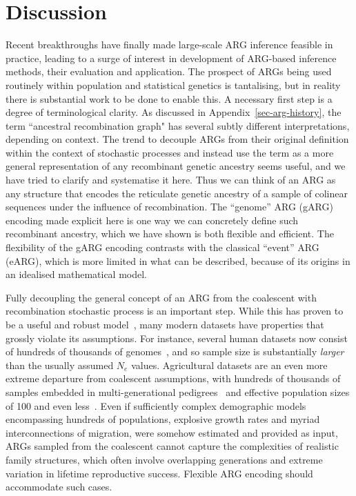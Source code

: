 \documentclass{article}
\begin{document}
\section{Discussion}
\label{sec-discussion}
Recent breakthroughs have finally made large-scale ARG inference
feasible in practice, leading to a surge of interest
in development of ARG-based inference methods, their evaluation
and application.
The prospect of ARGs being used routinely within population
and statistical genetics is tantalising,
but in reality there is substantial work to be done to
enable this.
A necessary first step is a degree of terminological clarity.
As discussed in Appendix~\ref{sec-arg-history}, the term
``ancestral recombination graph" has several
subtly different interpretations, depending on context.
The trend to decouple ARGs from their original definition
within the context of stochastic
processes and instead use the term as a more general representation of any
recombinant genetic ancestry seems useful, and we have
tried to clarify and systematise it here. Thus
we can think of an ARG as any structure that encodes the
reticulate genetic ancestry of a sample of colinear sequences under
the influence of recombination. The ``genome'' ARG (gARG) encoding
made explicit here is one way we can concretely
define such recombinant ancestry, which we have shown is both
flexible and efficient.
The flexibility of the gARG encoding contrasts with the classical
``event'' ARG (eARG), which is more limited in what can be described, because of its origins in an idealised mathematical model.

Fully decoupling the general concept of an ARG from the coalescent
with recombination stochastic process is an important step.
While this has proven to be a useful and
robust
model~\citep{wakeley2012gene,bhaskar2014distortion,nelson2020accounting},
many modern datasets have properties that grossly
violate its assumptions.
For instance, several human datasets now consist of hundreds of thousands of
genomes~\citep{bycroft2018genome,karczewski2020mutational,tanjo2021practical},
and so sample size is substantially \emph{larger} than the
usually assumed $N_e$ values.
Agricultural datasets are an even more extreme departure from coalescent
assumptions, with hundreds of thousands of samples embedded in
multi-generational pedigrees~\citep{hayes20191000,Ros-Freixedes2020}
and effective population sizes of 100 and even
less~\citep{MacLeod2013,Makanjuola2020,Hall2016,Porcnic2016}.
Even if sufficiently complex demographic models~\citep{gower2022demes}
encompassing hundreds of populations, explosive growth rates and
myriad interconnections of migration, were somehow estimated and
provided as input, ARGs sampled from
the coalescent cannot capture the complexities of realistic family structures, which often involve overlapping generations and extreme variation in lifetime reproductive success. Flexible ARG encoding should accommodate such cases.
\end{document}
